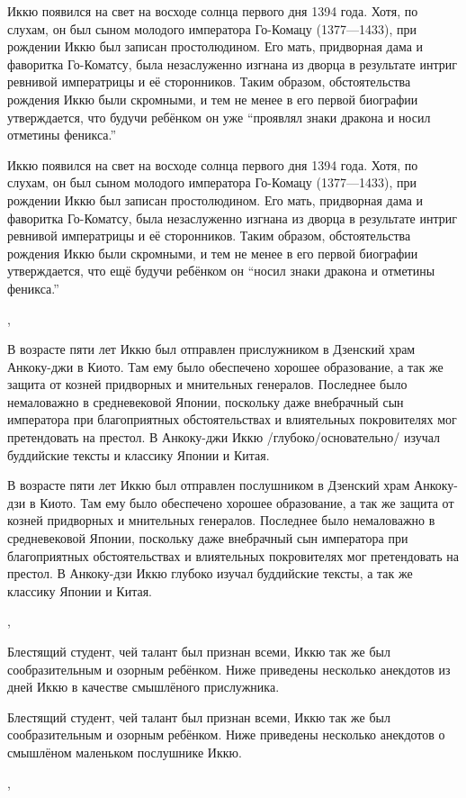 \begin{ver}
Иккю появился на свет на восходе солнца первого дня 1394 года. Хотя,
по слухам, он был сыном молодого императора Го-Комацу (1377---1433),
при рождении Иккю был записан простолюдином.
Его мать, придворная дама и фаворитка Го-Коматсу, была
незаслуженно изгнана из дворца в результате
интриг ревнивой императрицы и её сторонников.
Таким образом, обстоятельства рождения Иккю были скромными, и
тем не менее в его первой биографии утверждается, что будучи ребёнком
он уже ``проявлял знаки дракона и носил отметины феникса.''
\end{ver}
\begin{ver}[1]
Иккю появился на свет на восходе солнца первого дня 1394 года. Хотя,
по слухам, он был сыном молодого императора Го-Комацу (1377---1433),
при рождении Иккю был записан простолюдином.
Его мать, придворная дама и фаворитка Го-Коматсу, была
незаслуженно изгнана из дворца в результате
интриг ревнивой императрицы и её сторонников.
Таким образом, обстоятельства рождения Иккю были скромными, и
тем не менее в его первой биографии утверждается, что ещё будучи ребёнком
он ``носил знаки дракона и отметины феникса.''
\end{ver}
\sep
\begin{ver}
В возрасте пяти лет Иккю был отправлен прислужником в Дзенский
храм Анкоку-джи в Киото. Там ему было обеспечено хорошее образование,
а так же защита от козней придворных и мнительных генералов. Последнее
было немаловажно в средневековой Японии, поскольку даже внебрачный сын
императора при благоприятных обстоятельствах и влиятельных
покровителях мог претендовать на престол.  В Анкоку-джи Иккю
/глубоко/основательно/ изучал буддийские тексты и классику Японии и
Китая.
\end{ver}
\begin{ver}[1]
В возрасте пяти лет Иккю был отправлен послушником в Дзенский
храм Анкоку-дзи в Киото. Там ему было обеспечено хорошее образование,
а так же защита от козней придворных и мнительных генералов. Последнее
было немаловажно в средневековой Японии, поскольку даже внебрачный сын
императора при благоприятных обстоятельствах и влиятельных
покровителях мог претендовать на престол.  В Анкоку-дзи Иккю
глубоко изучал буддийские тексты, а так же классику Японии и
Китая.
\end{ver}
\sep

\begin{ver}
Блестящий студент, чей талант был признан всеми, Иккю так же был
сообразительным и озорным ребёнком. Ниже приведены несколько анекдотов
из дней Иккю в качестве смышлёного прислужника.  
\end{ver}
\begin{ver}[1]
Блестящий студент, чей талант был признан всеми, Иккю так же был
сообразительным и озорным ребёнком. Ниже приведены несколько анекдотов
о смышлёном маленьком послушнике Иккю.
\end{ver}
\sep

